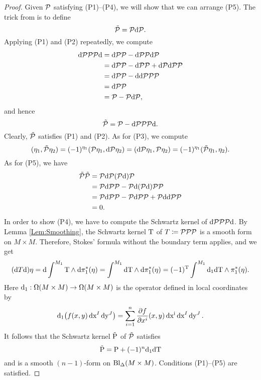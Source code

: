 \documentclass[\MainFolder/Text.tex]{subfiles}
\begin{document}
\begin{proof}
Given $\mathcal{P}$ satisfying (P1)--(P4), we will show that we can arrange (P5). The trick from \cite{Mnev2009} is to define
\[ \tilde{\mathcal{P}} = \mathcal{P} \mathrm{d} \mathcal{P}. \]
Applying (P1) and (P2) repeatedly, we compute
\begin{equation}\label{Eq:ExprGreen}
\begin{aligned}
\mathrm{d} \mathcal{P} \mathcal{P} \mathcal{P} \mathrm{d} &= \mathrm{d} \mathcal{P} \mathcal{P} - \mathrm{d} \mathcal{P} \mathcal{P} \mathrm{d} \mathcal{P} \\
&= \mathrm{d} \mathcal{P} \mathcal{P} - \mathrm{d} \mathcal{P} \mathcal{P} + \mathrm{d} \mathcal{P} \mathrm{d} \mathcal{P} \mathcal{P} \\ &= \mathrm{d} \mathcal{P} \mathcal{P} - \mathrm{d} \mathrm{d} \mathcal{P} \mathcal{P} \mathcal{P} \\
&= \mathrm{d} \mathcal{P} \mathcal{P} \\
& = \mathcal{P} - \mathcal{P} \mathrm{d} \mathcal{P}, 
\end{aligned}
\end{equation}
and hence
\[ \tilde{\mathcal{P}} = \mathcal{P} - \mathrm{d} \mathcal{P} \mathcal{P} \mathcal{P} \mathrm{d}. \]
Clearly, $\tilde{\mathcal{P}}$ satisfies (P1) and (P2). As for (P3), we compute
\[ (\eta_1, \tilde{\mathcal{P}} \eta_2) = (-1)^{\eta_1}(\mathcal{P} \eta_1, \mathrm{d} \mathcal{P} \eta_2) = (\mathrm{d} \mathcal{P} \eta_1, \mathcal{P} \eta_2) = (-1)^{\eta_1}(\tilde{\mathcal{P}}\eta_1,\eta_2). \]
As for (P5), we have
\begin{equation}\label{Eq:GSquared}
\begin{aligned}
\tilde{\mathcal{P}} \tilde{\mathcal{P}} &= \mathcal{P} \mathrm{d} \mathcal{P} (\mathcal{P}\mathrm{d}) \mathcal{P} \\
&= \mathcal{P} \mathrm{d} \mathcal{P} \mathcal{P} - \mathcal{P} \mathrm{d} (\mathcal{P} \mathrm{d}) \mathcal{P} \mathcal{P} \\
&= \mathcal{P} \mathrm{d} \mathcal{P} \mathcal{P} - \mathcal{P} \mathrm{d} \mathcal{P} \mathcal{P} + \mathcal{P} \mathrm{d} \mathrm{d} \mathcal{P} \mathcal{P} \\
&= 0.
\end{aligned}
\end{equation}
In order to show (P4), we have to compute the Schwartz kernel of $\mathrm{d}\mathcal{P}\mathcal{P}\mathcal{P}\mathrm{d}$. By Lemma \ref{Lem:Smoothing}, the Schwartz kernel $\mathrm{T}$ of $T\coloneqq \mathcal{P} \mathcal{P} \mathcal{P}$ is a smooth form on $M \times M$. Therefore, Stokes' formula without the boundary term applies, and we get 
\[ (\mathrm{d} T \mathrm{d})\eta = \mathrm{d} \int^{M_1} \mathrm{T} \wedge \mathrm{d} \pi_1^*(\eta) = \int^{M_1} \mathrm{d} \mathrm{T} \wedge \mathrm{d} \pi_1^*(\eta) = (-1)^{\mathrm{T}} \int^{M_1} \mathrm{d}_1 \mathrm{d} \mathrm{T} \wedge \pi_1^*(\eta). \]
Here $\mathrm{d}_1: \Omega(M\times M) \rightarrow \Omega(M\times M)$ is the operator defined in local coordinates by
\[ \mathrm{d}_1\bigl(f(x,y)\operatorname{dx}^I\operatorname{dy}^J\bigr) = \sum_{i=1}^n \frac{\partial f}{\partial x^i}(x,y)\operatorname{dx^i}\operatorname{dx}^I \operatorname{dy}^J. \]
It follows that the Schwartz kernel $\tilde{\mathrm{P}}$ of $\tilde{\mathcal{P}}$ satisfies 
\[ \tilde{\mathrm{P}} = \mathrm{P} + (-1)^{n} \mathrm{d}_1 \mathrm{d} \mathrm{T} \]
and is a smooth $(n-1)$-form on $\mathrm{Bl}_\Delta(M\times M)$. Conditions (P1)--(P5) are satisfied. \qedhere
\end{proof}
\end{document}
